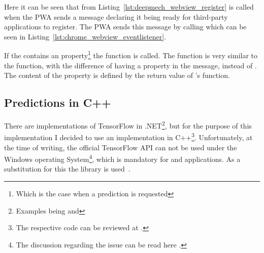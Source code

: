 Here it can be seen that  from Listing~\ref{lst:deepmech_webview_register} is called when the PWA sends a message declaring it being ready for third-party applications to register.
The PWA sends this message by calling  which can be seen in Listing~\ref{lst:chrome_webview_eventlistener}.

If the  contains an  property\footnote{Which is the case when a prediction is requested} the  function is called.
The  function is very similar to the  function, with the difference of having a  property in the message, instead of .
The content of the  property is defined by the return value of 's  function.

\subsection{Predictions in C++}

There are implementations of TensorFlow in .NET\footnote{Examples being  and }, but for the purpose of this implementation I decided to use an implementation in C++\footnote{The respective code can be reviewed at .}.
Unfortunately, at the time of writing, the official TensorFlow API can not be used under the Windows operating System\footnote{The discussion regarding the issue can be read here .}, which is mandatory for  and  applications.
As a substitution for this the  library is used~\cite{Hermann2021}.

